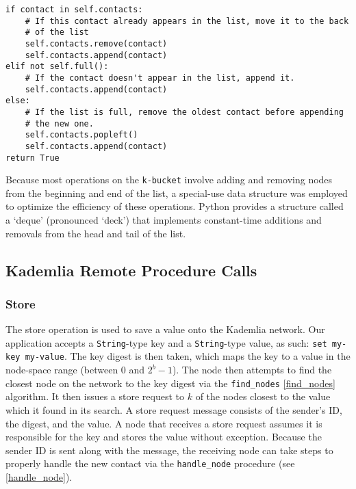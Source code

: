 \documentclass[12pt]{report}
\newcommand{\code}[1]{\colorbox{codegray}{\texttt{#1}}}
\begin{document}
\begin{lstlisting}[caption=KBucket.add(), label=kbucket_add]
if contact in self.contacts:
    # If this contact already appears in the list, move it to the back
    # of the list
    self.contacts.remove(contact)
    self.contacts.append(contact)
elif not self.full():
    # If the contact doesn't appear in the list, append it.
    self.contacts.append(contact)
else:
    # If the list is full, remove the oldest contact before appending
    # the new one.
    self.contacts.popleft()
    self.contacts.append(contact)
return True
\end{lstlisting}
            Because most operations on the \code{k-bucket} involve adding and
            removing nodes from the beginning and end of the list, a
            special-use data structure was employed to optimize the efficiency
            of these operations.  Python provides a structure called a `deque'
            (pronounced `deck') that implements constant-time additions and
            removals from the head and tail of the list.

        \subsection{Kademlia Remote Procedure Calls}
            \subsubsection{Store \label{store}}
               The store operation is used to save a value onto the Kademlia
               network.  Our application accepts a \code{String}-type key and a
               \code{String}-type value, as such: \code{set my-key my-value}.
               The key digest is then taken, which maps the key to a value in
               the node-space range (between 0 and $2^b-1$).  The node then
               attempts to find the closest node on the network to the key
               digest via the \code{find\_nodes} \ref{find_nodes} algorithm.  It
               then issues a store request to $k$ of the nodes closest to the
               value which it found in its search.  A store request message
               consists of the sender's ID, the digest, and the value.  A node
               that receives a store request assumes it is responsible for the
               key and stores the value without exception.  Because the sender
               ID is sent along with the message, the receiving node can take
               steps to properly handle the new contact via the
               \code{handle\_node} procedure (see \ref{handle_node}).
\end{document}
